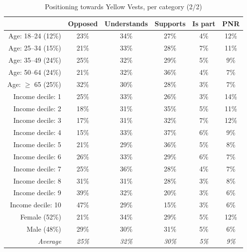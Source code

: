 \documentclass[aspectratio=169,9pt,dvipsnames]{beamer}
\begin{document}
	\begin{frame}\label{who_are_the_YV_2}

\begin{table}
\centering
\caption{Positioning towards Yellow Vests, per category (2/2)}
{\fontsize{6}{6}\selectfont
\begin{tabular}{rccccc}
  \hline \hline
 & Opposed & Understands & Supports & Is part & PNR \\ 
  \hline
  Age: 18--24 (12\%) & 23\% & 34\% & 27\% & 4\% & 12\% \\ 
  Age: 25--34 (15\%) & 21\% & 33\% & 28\% & 7\% & 11\% \\ 
  Age: 35--49 (24\%) & 25\% & 32\% & 29\% & 5\% & 9\% \\ 
  Age: 50--64 (24\%) & 21\% & 32\% & 36\% & 4\% & 7\% \\ 
  Age: $\geq$ 65 (25\%) & 32\% & 30\% & 28\% & 3\% & 7\% \\
  \hline
  Income decile: 1 & 25\% & 33\% & 26\% & 3\% & 14\% \\ 
  Income decile: 2 & 18\% & 31\% & 35\% & 5\% & 11\% \\
  Income decile: 3 & 17\% & 31\% & 32\% & 7\% & 12\% \\
  Income decile: 4 & 15\% & 33\% & 37\% & 6\% & 9\% \\
  Income decile: 5 & 21\% & 29\% & 36\% & 5\% & 8\% \\
  Income decile: 6 & 26\% & 33\% & 29\% & 6\% & 7\% \\
  Income decile: 7 & 25\% & 36\% & 28\% & 4\% & 7\% \\
  Income decile: 8 & 31\% & 31\% & 28\% & 3\% & 8\% \\
  Income decile: 9 & 39\% & 32\% & 20\% & 3\% & 6\% \\
  Income decile: 10 & 47\% & 29\% & 15\% & 3\% & 6\% \\
  \hline
  Female (52\%) & 21\% & 34\% & 29\% & 5\% & 12\% \\
  Male (48\%) & 29\% & 30\% & 31\% & 5\% & 6\% \\
  \hline
  \textit{Average} & \textit{25\%} & \textit{32\%} & \textit{30\%} & \textit{5\%} & \textit{9\%} \\ 
   \hline \hline
\end{tabular}
}
\end{table}

\hyperlink{discussion}{}


	\end{frame}
\end{document}
